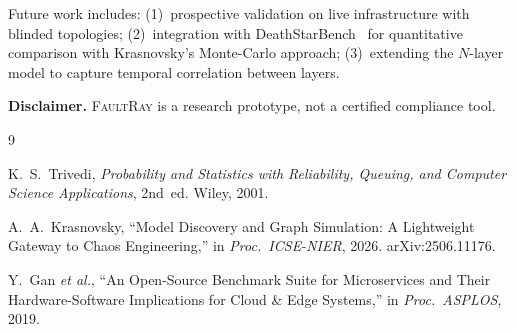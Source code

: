 \documentclass[conference,10pt]{IEEEtran}
\begin{document}
Future work includes: (1)~prospective validation on live
infrastructure with blinded topologies; (2)~integration with
DeathStarBench~\cite{gan2019} for quantitative comparison with
Krasnovsky's Monte-Carlo approach; (3)~extending the $N$-layer
model to capture temporal correlation between layers.

\textbf{Disclaimer.} \textsc{FaultRay} is a research prototype,
not a certified compliance tool.


\begin{thebibliography}{9}

K.~S.~Trivedi,
\textit{Probability and Statistics with Reliability, Queuing, and
Computer Science Applications}, 2nd~ed.
Wiley, 2001.

A.~A.~Krasnovsky,
``Model Discovery and Graph Simulation: A Lightweight Gateway to
Chaos Engineering,''
in \textit{Proc.\ ICSE-NIER}, 2026.
arXiv:2506.11176.

Y.~Gan \textit{et al.},
``An Open-Source Benchmark Suite for Microservices and Their
Hardware-Software Implications for Cloud \& Edge Systems,''
in \textit{Proc.\ ASPLOS}, 2019.

\end{thebibliography}
\end{document}
